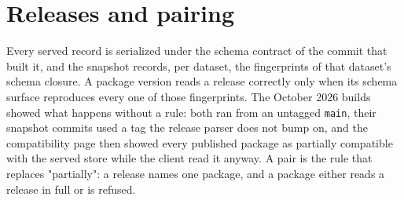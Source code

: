 
\section{Releases and pairing}
\label{sec:pairing}


Every served record is serialized under the schema contract of the commit that
built it, and the snapshot records, per dataset, the fingerprints of that
dataset's schema closure. A package version reads a release correctly only when
its schema surface reproduces every one of those fingerprints. The October 2026
builds showed what happens without a rule: both ran from an untagged \texttt{main},
their snapshot commits used a tag the release parser does not bump on, and the
compatibility page then showed every published package as partially compatible
with the served store while the client read it anyway. A pair is the rule that
replaces "partially": a release names one package, and a package either reads a
release in full or is refused.

